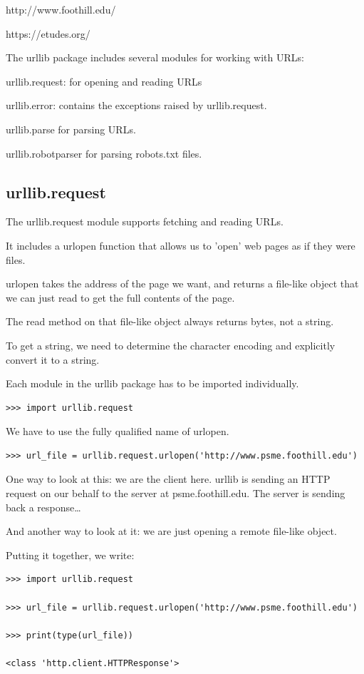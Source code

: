 \documentclass{article}
\begin{document}
http://www.foothill.edu/

https://etudes.org/

The urllib package includes several modules for working with URLs:

urllib.request: for opening and reading URLs

urllib.error: contains the exceptions raised by  urllib.request.

urllib.parse  for parsing URLs.

urllib.robotparser  for parsing robots.txt files.

\subsection{urllib.request}
The urllib.request module supports fetching and reading URLs. 

It includes a urlopen function  that allows us to 'open' web pages as if they were files.

urlopen takes the address of the page we want, and returns a file-like object that we can just read to get the full contents of the page. 

The read method on that file-like object always returns bytes, not a string.

To get a string, we need to determine the character encoding and explicitly convert it to a string.

Each module in the urllib package has to be imported individually.

\begin{lstlisting}
>>> import urllib.request 
\end{lstlisting}

We have to use the fully qualified name of urlopen.

\begin{lstlisting}
>>> url_file = urllib.request.urlopen('http://www.psme.foothill.edu') 
\end{lstlisting}

One way to look at this:  we are the client here.  urllib is sending an HTTP request on our behalf to the server at psme.foothill.edu.  The server is sending back a response…

And another way to look at it:  we are just opening a remote file-like object.

Putting it together, we write:

\begin{lstlisting}
>>> import urllib.request 

>>> url_file = urllib.request.urlopen('http://www.psme.foothill.edu') 

>>> print(type(url_file))

<class 'http.client.HTTPResponse'>
\end{lstlisting}
\end{document}
